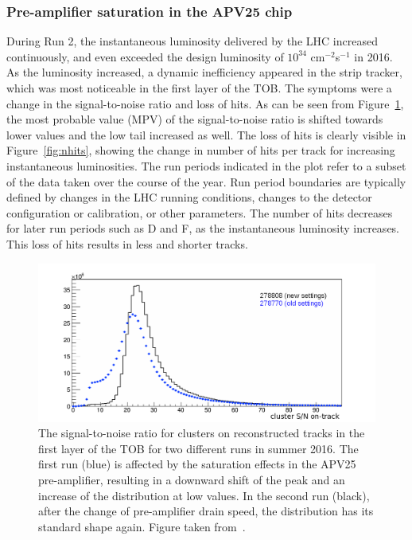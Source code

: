 \subsubsection{Pre-amplifier saturation in the APV25 chip}
\label{sec:APVsaturation}

During Run 2, the instantaneous luminosity delivered by the \ac{LHC} increased continuously, and even exceeded the design luminosity of $10^{34}$ cm$^{-2}$s$^{-1}$ in 2016. As the luminosity increased, a dynamic inefficiency appeared in the strip tracker, which was most noticeable in the first layer of the \ac{TOB}. The symptoms were a change in the signal-to-noise ratio and loss of hits. As can be seen from Figure~\ref{fig:SOverN}, the most probable value (MPV) of the signal-to-noise ratio is shifted towards lower values and the low tail increased as well. The loss of hits is clearly visible in Figure~\ref{fig:nhits}, showing the change in number of hits per track for increasing instantaneous luminosities. The run periods indicated in the plot refer to a subset of the data taken over the course of the year. Run period boundaries are typically defined by changes in the \ac{LHC} running conditions, changes to the detector configuration or calibration, or other parameters. The number of hits decreases for later run periods such as D and F, as the instantaneous luminosity increases. This loss of hits results in less and shorter tracks.
  
\begin{figure}[ht]
  \centering
 \includegraphics[width=.9\textwidth]{APVsaturation_SOverN}
 \caption{The signal-to-noise ratio for clusters on reconstructed tracks in the first layer of the \ac{TOB} for two different runs in summer 2016. The first run (blue) is affected by the saturation effects in the APV25 pre-amplifier, resulting in a downward shift of the peak and an increase of the distribution at low values. In the second run (black), after the change of pre-amplifier drain speed, the distribution has its standard shape again. Figure taken from~\cite{Erik}.}
 \label{fig:SOverN}
\end{figure}

